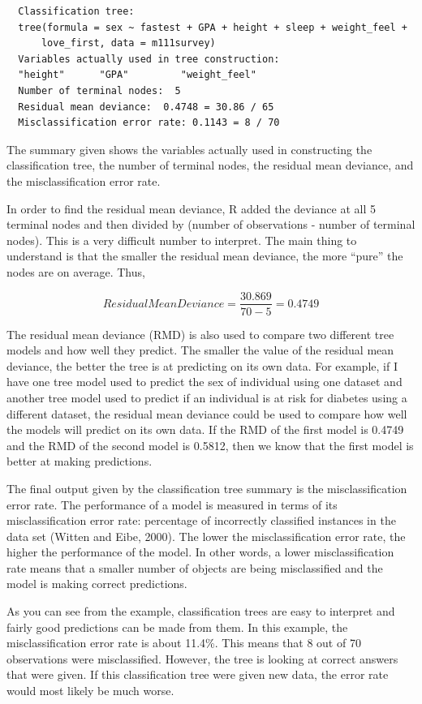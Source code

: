 \documentclass[12pt,twoside]{reedthesis}
\begin{document}
  \begin{verbatim}
  Classification tree:
  tree(formula = sex ~ fastest + GPA + height + sleep + weight_feel + 
      love_first, data = m111survey)
  Variables actually used in tree construction:
  "height"      "GPA"         "weight_feel"
  Number of terminal nodes:  5 
  Residual mean deviance:  0.4748 = 30.86 / 65 
  Misclassification error rate: 0.1143 = 8 / 70
  \end{verbatim}
  
  The summary given shows the variables actually used in constructing the
  classification tree, the number of terminal nodes, the residual mean
  deviance, and the misclassification error rate.
  
  In order to find the residual mean deviance, R added the deviance at all
  5 terminal nodes and then divided by (number of observations - number of
  terminal nodes). This is a very difficult number to interpret. The main
  thing to understand is that the smaller the residual mean deviance, the
  more ``pure'' the nodes are on average. Thus,
  
  \[ Residual Mean Deviance = \frac{30.869}{70-5} = 0.4749\]
  
  The residual mean deviance (RMD) is also used to compare two different
  tree models and how well they predict. The smaller the value of the
  residual mean deviance, the better the tree is at predicting on its own
  data. For example, if I have one tree model used to predict the sex of
  individual using one dataset and another tree model used to predict if
  an individual is at risk for diabetes using a different dataset, the
  residual mean deviance could be used to compare how well the models will
  predict on its own data. If the RMD of the first model is 0.4749 and the
  RMD of the second model is 0.5812, then we know that the first model is
  better at making predictions.
  
  The final output given by the classification tree summary is the
  misclassification error rate. The performance of a model is measured in
  terms of its misclassification error rate: percentage of incorrectly
  classified instances in the data set (Witten and Eibe, 2000). The lower
  the misclassification error rate, the higher the performance of the
  model. In other words, a lower misclassification rate means that a
  smaller number of objects are being misclassified and the model is
  making correct predictions.
  
  As you can see from the example, classification trees are easy to
  interpret and fairly good predictions can be made from them. In this
  example, the misclassification error rate is about 11.4\%. This means
  that 8 out of 70 observations were misclassified. However, the tree is
  looking at correct answers that were given. If this classification tree
  were given new data, the error rate would most likely be much worse.
  
\end{document}
